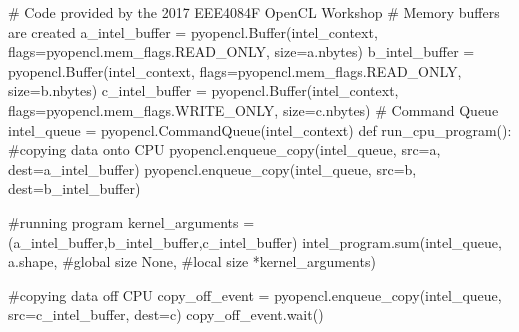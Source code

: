 \begin{OpenCL}
# Code provided by the 2017 EEE4084F OpenCL Workshop
# Memory buffers are created
a_intel_buffer = pyopencl.Buffer(intel_context,
                                 flags=pyopencl.mem_flags.READ_ONLY, 
                                 size=a.nbytes)
b_intel_buffer = pyopencl.Buffer(intel_context, 
                                 flags=pyopencl.mem_flags.READ_ONLY, 
                                 size=b.nbytes)
c_intel_buffer = pyopencl.Buffer(intel_context, 
                                 flags=pyopencl.mem_flags.WRITE_ONLY, 
                                 size=c.nbytes)
# Command Queue
intel_queue = pyopencl.CommandQueue(intel_context)
def run_cpu_program():
    #copying data onto CPU
    pyopencl.enqueue_copy(intel_queue,
                          src=a,
                          dest=a_intel_buffer)
    pyopencl.enqueue_copy(intel_queue,
                          src=b,
                          dest=b_intel_buffer)
    
    #running program
    kernel_arguments = (a_intel_buffer,b_intel_buffer,c_intel_buffer) 
    intel_program.sum(intel_queue,
                       a.shape, #global size
                       None, #local size
                       *kernel_arguments)

    #copying data off CPU
    copy_off_event = pyopencl.enqueue_copy(intel_queue,
                                           src=c_intel_buffer,
                                           dest=c)
    copy_off_event.wait()
\end{OpenCL}